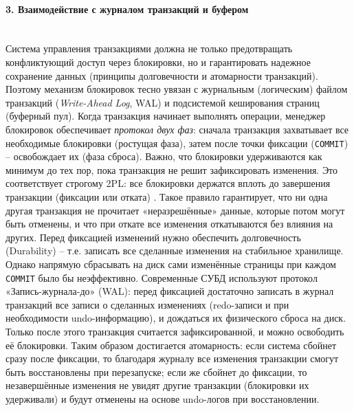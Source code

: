 \paragraph{3. Взаимодействие с журналом транзакций и буфером} ~\\
 Система управления транзакциями должна не только предотвращать конфликтующий доступ через блокировки, но и гарантировать надежное сохранение данных (принципы долговечности и атомарности транзакций). Поэтому механизм блокировок тесно увязан с журнальным (логическим) файлом транзакций (\textit{Write-Ahead Log}, WAL) и подсистемой кеширования страниц (буферный пул). 
 Когда транзакция начинает выполнять операции, менеджер блокировок обеспечивает \textit{протокол двух фаз}: сначала транзакция захватывает все необходимые блокировки (ростущая фаза), затем после точки фиксации (\texttt{COMMIT}) – освобождает их (фаза сброса). Важно, что блокировки удерживаются как минимум до тех пор, пока транзакция не решит зафиксировать изменения. Это соответствует строгому 2PL: все блокировки держатся вплоть до завершения транзакции (фиксации или отката) \autocite{WashCoursesLec5}. Такое правило гарантирует, что ни одна другая транзакция не прочитает «неразрешённые» данные, которые потом могут быть отменены, и что при откате все изменения откатываются без влияния на других. 
 Перед фиксацией изменений нужно обеспечить долговечность (Durability) – т.е. записать все сделанные изменения на стабильное хранилище. Однако напрямую сбрасывать на диск сами изменённые страницы при каждом \texttt{COMMIT} было бы неэффективно. Современные СУБД используют протокол «Запись-журнала-до» (WAL): перед фиксацией достаточно записать в журнал транзакций все записи о сделанных изменениях (redo-записи и при необходимости undo-информацию), и дождаться их физического сброса на диск. Только после этого транзакция считается зафиксированной, и можно освободить её блокировки. Таким образом достигается атомарность: если система сбойнет сразу после фиксации, то благодаря журналу все изменения транзакции смогут быть восстановлены при перезапуске; если же сбойнет до фиксации, то незавершённые изменения не увидят другие транзакции (блокировки их удерживали) и будут отменены на основе undo-логов при восстановлении. ~\\
 
